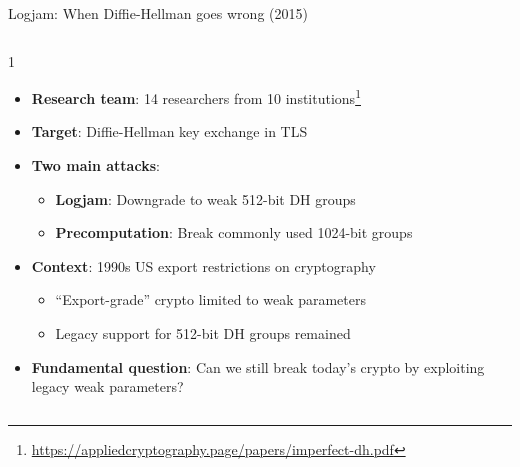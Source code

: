 \documentclass[aspectratio=169, lualatex, handout]{beamer}
\begin{document}
\begin{frame}{Logjam: When Diffie-Hellman goes wrong (2015)}
	\begin{columns}[c]
		\begin{column}{1\textwidth}
			\begin{itemize}[<+->]
				\item \textbf{Research team}: 14 researchers from 10 institutions\footnote{\url{https://appliedcryptography.page/papers/imperfect-dh.pdf}}
				\item \textbf{Target}: Diffie-Hellman key exchange in TLS
				\item \textbf{Two main attacks}:
				      \begin{itemize}
					      \item \textbf{Logjam}: Downgrade to weak 512-bit DH groups
					      \item \textbf{Precomputation}: Break commonly used 1024-bit groups
				      \end{itemize}
				\item \textbf{Context}: 1990s US export restrictions on cryptography
				      \begin{itemize}
					      \item ``Export-grade'' crypto limited to weak parameters
					      \item Legacy support for 512-bit DH groups remained
				      \end{itemize}
				\item \textbf{Fundamental question}: Can we still break today's crypto by exploiting legacy weak parameters?
			\end{itemize}
		\end{column}
	\end{columns}
\end{frame}
\end{document}
